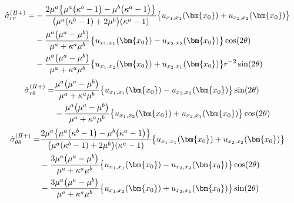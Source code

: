 \begin{align}
	\hat{\sigma}_{rr}^{(I\hspace{-.15em}I+)} =
	&-\frac{2\mu^{a}\bigl\{ \mu^{a}\bigl(\kappa^{b}-1\bigr)-\mu^{b}\bigl(\kappa^{a}-1\bigr)\bigr\}}
	{\bigl(\mu^{a}(\kappa^{b}-1)+2\mu^{b}\bigr)(\kappa^{a}-1)}
	\bigl\{u_{x_{1},x_{1}}(\bm{x_{0}})+u_{x_{2},x_{2}}(\bm{x_{0}})\bigr\}
	\nonumber
	\\
	&-\frac{\mu^{a}\bigl(\mu^{a}-\mu^{b}\bigr)}{\mu^{a}+\kappa^{a}\mu^{b}}
	\bigl\{u_{x_{1},x_{1}}(\bm{x_{0}})-u_{x_{2},x_{2}}(\bm{x_{0}})\bigr\}\cos(2\theta)
	\nonumber
	\\
	&-\frac{\mu^{a}\bigl(\mu^{a}-\mu^{b}\bigr)}{\mu^{a}+\kappa^{a}\mu^{b}}
	\bigl\{u_{x_{1},x_{2}}(\bm{x_{0}})+u_{x_{2},x_{1}}(\bm{x_{0}})\bigr\}r^{-2}\sin(2\theta)
	\label{eq:SigmaRROut2Sol}
\end{align}
\begin{align}
	\hat{\sigma}_{r\theta}^{(I\hspace{-.15em}I+)} =
	&\frac{\mu^{a}\bigl(\mu^{a}-\mu^{b}\bigr)}{\mu^{a}+\kappa^{a}\mu^{b}}
	\bigl\{u_{x_{1},x_{1}}(\bm{x_{0}})-u_{x_{2},x_{2}}(\bm{x_{0}})\bigr\}\sin(2\theta)
	\nonumber
	\\
	&-\frac{\mu^{a}\bigl(\mu^{a}-\mu^{b}\bigr)}{\mu^{a}+\kappa^{a}\mu^{b}}
	\bigl\{u_{x_{1},x_{2}}(\bm{x_{0}})+u_{x_{2},x_{1}}(\bm{x_{0}})\bigr\}\cos(2\theta)
	\label{eq:SigmaRThOut2Sol}
\end{align}
\begin{align}
	\hat{\sigma}_{\theta\theta}^{(I\hspace{-.15em}I+)} =
	&\frac{2\mu^{a}\bigl\{ \mu^{a}\bigl(\kappa^{b}-1\bigr)-\mu^{b}\bigl(\kappa^{a}-1\bigr)\bigr\}}
	{\bigl(\mu^{a}(\kappa^{b}-1)+2\mu^{b}\bigr)(\kappa^{a}-1)}
	\bigl\{u_{x_{1},x_{1}}(\bm{x_{0}})+u_{x_{2},x_{2}}(\bm{x_{0}})\bigr\}
	\nonumber
	\\
	&-\frac{3\mu^{a}\bigl(\mu^{a}-\mu^{b}\bigr)}{\mu^{a}+\kappa^{a}\mu^{b}}
	\bigl\{u_{x_{1},x_{1}}(\bm{x_{0}})-u_{x_{2},x_{2}}(\bm{x_{0}})\bigr\}\cos(2\theta)
	\nonumber
	\\
	&-\frac{3\mu^{a}\bigl(\mu^{a}-\mu^{b}\bigr)}{\mu^{a}+\kappa^{a}\mu^{b}}
	\bigl\{u_{x_{1},x_{2}}(\bm{x_{0}})+u_{x_{2},x_{1}}(\bm{x_{0}})\bigr\}\sin(2\theta)
	\label{eq:SigmaThThOut2Sol}
\end{align}

